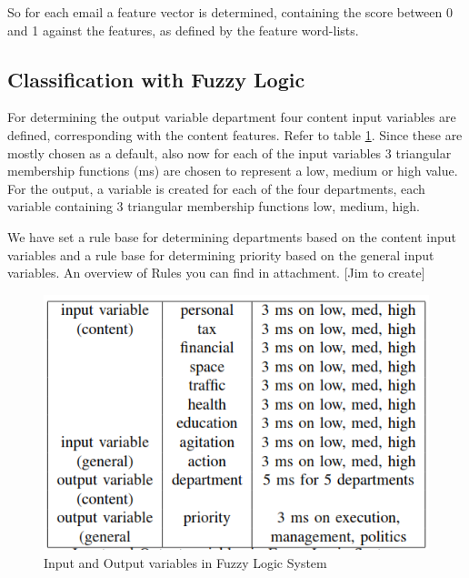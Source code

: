 \documentclass[journal]{IEEEtran}
\begin{document}
So for each email a feature vector is determined, containing the score between 0 and 1 against the features, as defined by the feature word-lists. 

\subsection{Classification with Fuzzy Logic}

For determining the output variable department four content input variables are defined, corresponding with the content features. Refer to table \ref{table:1}. Since these are mostly chosen as a default, also now for each of the input variables 3 triangular membership functions (ms) are chosen to represent a low, medium or high value. For the output, a variable is created for each of the four departments, each variable containing 3 triangular membership functions low, medium, high.

We have set a rule base for determining departments based on the content input variables and a rule base for determining priority based on the general input variables. An overview of Rules you can find in attachment. [Jim to create] \\

\begin{figure}
	\includegraphics[scale=0.5]{res/inputs_outputs_FLS.png}
	\caption{Input and Output variables in Fuzzy Logic System}
	\label{table:1}
\end{figure}
\end{document}
